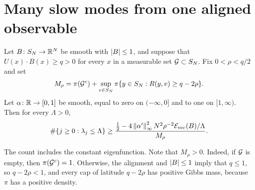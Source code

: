 \section{Many slow modes from one aligned observable}\label{sec:sp-bumps}

\begin{lemma}\label{lem:sp-bumps}
Let $B\colon S_N\to\mathbb R^N$ be smooth with $\left|B\right|\le1$, and suppose that $U(x)\cdot B(x)\ge q>0$ for every $x$ in a measurable set $\mathcal G\subset S_N$. Fix $0<\rho<q/2$ and set
\[
M_\rho=\pi(\mathcal G^c)+\sup_{v\in S_N}\pi\{y\in S_N:R(y,v)\ge q-2\rho\}.
\]
Let $\alpha\colon\mathbb R\to[0,1]$ be smooth, equal to zero on $(-\infty,0]$ and to one on $[1,\infty)$. Then for every $\Lambda>0$,
\begin{equation}\label{eq:sp-bumps}
\#\{j\ge0:\lambda_j\le\Lambda\}\ge\frac{\frac12-4\left\lVert\alpha'\right\rVert_\infty^2N^2\rho^{-2}\mathcal E_{\rm vec}(B)/\Lambda}{M_\rho}.
\end{equation}
\end{lemma}

The count includes the constant eigenfunction. Note that $M_\rho>0$. Indeed, if $\mathcal G$ is empty, then $\pi(\mathcal G^c)=1$. Otherwise, the alignment and $\left|B\right|\le1$ imply that $q\le1$, so $q-2\rho<1$, and every cap of latitude $q-2\rho$ has positive Gibbs mass, because $\pi$ has a positive density.

